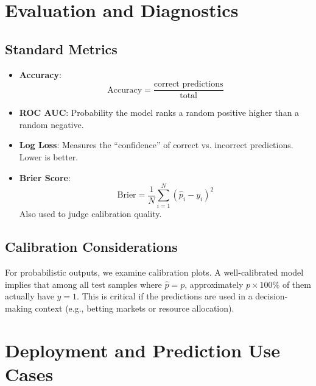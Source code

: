 \documentclass[12pt]{article}
\begin{document}
\section{Evaluation and Diagnostics}

\subsection{Standard Metrics}
\begin{itemize}[noitemsep]
    \item \textbf{Accuracy}: 
    \[
    \text{Accuracy} = \frac{\text{correct predictions}}{\text{total}}
    \]
    \item \textbf{ROC AUC}: Probability the model ranks a random positive higher than a random negative. 
    \item \textbf{Log Loss}: Measures the “confidence” of correct vs. incorrect predictions. Lower is better.
    \item \textbf{Brier Score}: 
    \[
    \text{Brier} = \frac{1}{N} \sum_{i=1}^N (\hat{p}_i - y_i)^2
    \]
    Also used to judge calibration quality.
\end{itemize}

\subsection{Calibration Considerations}
For probabilistic outputs, we examine calibration plots. A well-calibrated model implies that among all test samples where \(\hat{p} = p\), approximately \(p \times 100\%\) of them actually have \(y=1\). This is critical if the predictions are used in a decision-making context (e.g., betting markets or resource allocation).

\section{Deployment and Prediction Use Cases}
\end{document}
